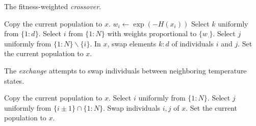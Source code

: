 \documentclass{beamer}
\begin{document}
\begin{frame}
 \begin{algorithm}[H]
   \caption{The fitness-weighted {\it crossover}.}
   \label{alg:crossover}
   \footnotesize
   \begin{algorithmic}
     \State Copy the current population to $x$.
     \State $w_i \gets \exp(-H(x_i))$
     \EndFor
     \State Select $k$ uniformly from $\{1\colon d\}.$
     \State Select $i$ from $\{1\colon N\}$ with weights proportional
     to $\{w_\cdot\}$.
     \State Select $j$ uniformly from $\{1\colon N\} \backslash \{i\}.$ 
    \State In $x$, swap elements $k\colon d$ of individuals $i$ and $j$.
     \State  Set the  current population to $x$.
     \EndWp
     \EndProcedure
   \end{algorithmic}
 \end{algorithm}
 \end{frame}


\begin{frame}
\begin{algorithm}[H]
\caption{The {\it exchange} attempts to swap individuals between neighboring temperature states.}
  \label{alg:exchange}
  \footnotesize
  \begin{algorithmic}
    \State Copy the current population to $x$.
    \State Select $i$ uniformly from $\{1\colon N\}$. 
    \State Select $j$ uniformly from $\{i\pm 1\}\cap\{1\colon N\}$.
    \State Swap individuals $i,j$ of $x$.
    \State Set the current population to $x$.
    \EndWp
    \EndProcedure
  \end{algorithmic}
\end{algorithm}
\end{frame}
\end{document}
